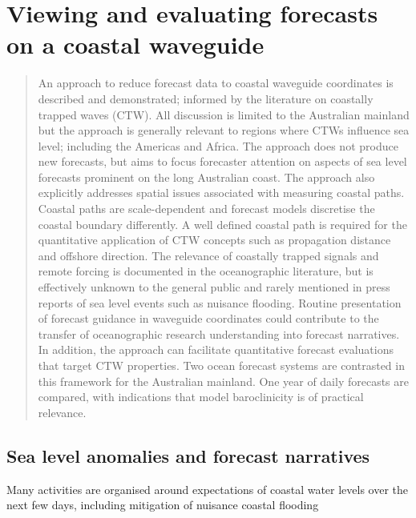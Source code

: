 \chapter{Viewing and evaluating forecasts on a coastal waveguide}
\label{chp:waveguide}

\begin{quote}
{\small
An approach to reduce forecast data to coastal waveguide coordinates is described and demonstrated; informed by the literature on coastally trapped waves (CTW).  All discussion is limited to the Australian mainland but the approach is generally relevant to regions where CTWs influence sea level; including the Americas and Africa. The approach does not produce new forecasts, but aims to focus forecaster attention on aspects of sea level forecasts prominent on the long Australian coast.  The approach also explicitly addresses spatial issues associated with measuring coastal paths. 
Coastal paths are scale-dependent and forecast models discretise the coastal boundary differently. 
A well defined coastal path is required for the quantitative application of CTW concepts such as propagation distance and offshore direction.
The relevance of coastally trapped signals and remote forcing is documented in the oceanographic literature, but is effectively unknown to the general public and rarely mentioned in press reports of sea level events such as nuisance flooding.
Routine presentation of forecast guidance in waveguide coordinates could contribute to the transfer of oceanographic research understanding into forecast narratives.
In addition, the approach can facilitate quantitative forecast evaluations that target CTW properties.
Two ocean forecast systems are contrasted in this framework for the Australian mainland.
One year of daily forecasts are compared, with indications that model baroclinicity is of practical relevance.  
}
\end{quote} 

\section{Sea level anomalies and forecast narratives}

Many activities are organised around expectations of coastal water levels over the next few days, including mitigation of  nuisance coastal flooding \citep{Sweet:2014ss, Hague:2019ha}

